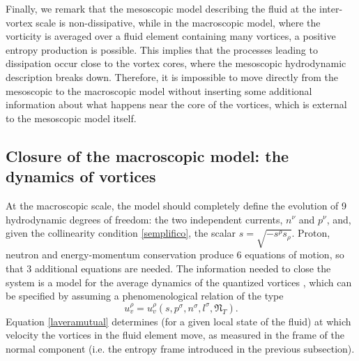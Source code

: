 \documentclass[preprints,article,accept,moreauthors,pdftex]{mdpi}
\begin{document}
Finally, we remark that the mesoscopic model describing the fluid at the inter-vortex scale is non-dissipative, while in the macroscopic model, where the vorticity is averaged over a fluid element containing many vortices, a positive entropy production is possible. 
This implies that the processes leading to dissipation occur close to  the vortex cores, where the mesoscopic hydrodynamic description breaks down. Therefore, it is impossible to move directly from the mesoscopic to the macroscopic model without inserting some additional information about what happens near the core of the vortices, which is external to the mesoscopic model itself. 



\subsection{Closure of the macroscopic model: the dynamics of vortices}

At the macroscopic scale, the model should completely define the evolution of 9 hydrodynamic degrees of freedom: the two independent currents, $n^\nu$ and $p^\nu$, and, given the collinearity condition \eqref{semplifico}, the scalar $s=\sqrt{-s^\rho s_\rho}$. 
Proton, neutron and energy-momentum conservation produce 6 equations of motion, so that 3 additional equations are needed. 
The information needed to close the system is a model for the average dynamics of the quantized vortices \cite{nemirovskii_closure_2020JLTP}, which can be specified by assuming a phenomenological relation of the type 
\begin{equation}
\label{laveramutual}
u_v^\rho  = u_v^\rho (s,p^\sigma,n^\sigma,l^\sigma,\mathfrak{N}_{T}).
\end{equation}
Equation \eqref{laveramutual} determines (for a given local state of the fluid) at which velocity the vortices in the fluid element move, as measured in the frame of the normal component (i.e. the entropy frame introduced in the previous subsection).
\end{document}
